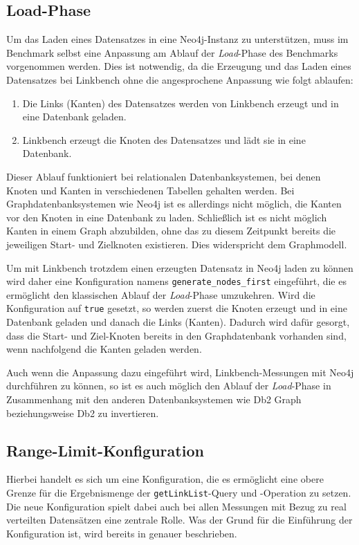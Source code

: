 \subsection{Load-Phase}
\label{implementierung:anpassung:load}
Um das Laden eines Datensatzes in eine Neo4j-Instanz zu unterstützen, muss im Benchmark selbst eine Anpassung am Ablauf der \textit{Load}-Phase des Benchmarks vorgenommen werden. Dies ist notwendig, da die Erzeugung und das Laden eines Datensatzes bei Linkbench ohne die angesprochene Anpassung wie folgt ablaufen:
\begin{enumerate}
    \item Die Links (Kanten) des Datensatzes werden von Linkbench erzeugt und in eine Datenbank geladen. 
    \item Linkbench erzeugt die Knoten des Datensatzes und lädt sie in eine Datenbank. 
\end{enumerate}
Dieser Ablauf funktioniert bei relationalen Datenbanksystemen, bei denen Knoten und Kanten in verschiedenen Tabellen gehalten werden. Bei Graphdatenbanksystemen wie Neo4j ist es allerdings nicht möglich, die Kanten vor den Knoten in eine Datenbank zu laden. Schließlich ist es nicht möglich Kanten in einem Graph abzubilden, ohne das zu diesem Zeitpunkt bereits die jeweiligen Start- und Zielknoten existieren. Dies widerspricht dem Graphmodell.

Um mit Linkbench trotzdem einen erzeugten Datensatz in Neo4j laden zu können wird daher eine Konfiguration namens \texttt{generate\_nodes\_first} eingeführt, die es ermöglicht den klassischen Ablauf der \textit{Load}-Phase umzukehren. Wird die Konfiguration auf \texttt{true} gesetzt, so werden zuerst die Knoten erzeugt und in eine Datenbank geladen und danach die Links (Kanten). Dadurch wird dafür gesorgt, dass die Start- und Ziel-Knoten bereits in den Graphdatenbank vorhanden sind, wenn nachfolgend die Kanten geladen werden. 

Auch wenn die Anpassung dazu eingeführt wird, Linkbench-Messungen mit Neo4j durchführen zu können, so ist es auch möglich den Ablauf der \textit{Load}-Phase in Zusammenhang mit den anderen Datenbanksystemen wie Db2 Graph beziehungsweise Db2 zu invertieren. 

\subsection{Range-Limit-Konfiguration}
\label{implementierung:anpassung:limit}
Hierbei handelt es sich um eine Konfiguration, die es ermöglicht eine obere Grenze für die Ergebnismenge der \texttt{getLinkList}-Query und -Operation zu setzen. Die neue Konfiguration spielt dabei auch bei allen Messungen mit Bezug zu real verteilten Datensätzen eine zentrale Rolle. Was der Grund für die Einführung der Konfiguration ist, wird bereits in  genauer beschrieben. 

